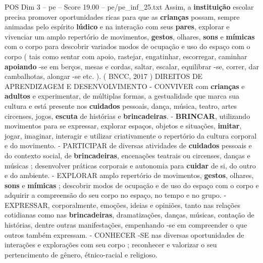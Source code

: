 \begin{textsample}{POS Dim 3 – pe – Score 19.00 – pe/pe\_inf\_25.txt}
Assim, a \textbf{instituição} escolar precisa promover oportunidades ricas para que as \textbf{crianças} possam, sempre animadas pelo espírito \textbf{lúdico} e na interação com seus \textbf{pares}, explorar e vivenciar um amplo repertório de movimentos, \textbf{gestos}, olhares, \textbf{sons} e \textbf{mímicas} com o corpo para descobrir variados modos de ocupação e uso do espaço com o corpo ( tais como sentar com apoio, rastejar, engatinhar, escorregar, caminhar \textbf{apoiando} -se em berços, mesas e cordas, saltar, escalar, equilibrar -se, correr, dar cambalhotas, alongar -se etc. ). ( BNCC, 2017 ) DIREITOS DE APRENDIZAGEM E DESENVOLVIMENTO - CONVIVER com \textbf{crianças} e \textbf{adultos} e experimentar, de múltiplas formas, a gestualidade que marca sua cultura e está presente nos \textbf{cuidados} pessoais, dança, música, teatro, artes circenses, jogos, \textbf{escuta} de histórias e \textbf{brincadeiras}. - \textbf{BRINCAR}, utilizando movimentos para se expressar, explorar espaços, objetos e situações, \textbf{imitar}, jogar, imaginar, interagir e utilizar criativamente o repertório da cultura corporal e do movimento. - PARTICIPAR de diversas atividades de \textbf{cuidados} pessoais e do contexto social, de \textbf{brincadeiras}, encenações teatrais ou circenses, danças e músicas ; desenvolver práticas corporais e autonomia para \textbf{cuidar} de si, do outro e do ambiente. - EXPLORAR amplo repertório de movimentos, \textbf{gestos}, olhares, \textbf{sons} e \textbf{mímicas} ; descobrir modos de ocupação e de uso do espaço com o corpo e adquirir a compreensão do seu corpo no espaço, no tempo e no grupo. - EXPRESSAR, corporalmente, emoções, ideias e opiniões, tanto nas relações cotidianas como nas \textbf{brincadeiras}, dramatizações, danças, músicas, contação de histórias, dentre outras manifestações, empenhando -se em compreender o que outros também expressam. - CONHECER -SE nas diversas oportunidades de interações e explorações com seu corpo ; reconhecer e valorizar o seu pertencimento de gênero, étnico-racial e religioso.

\end{textsample}
